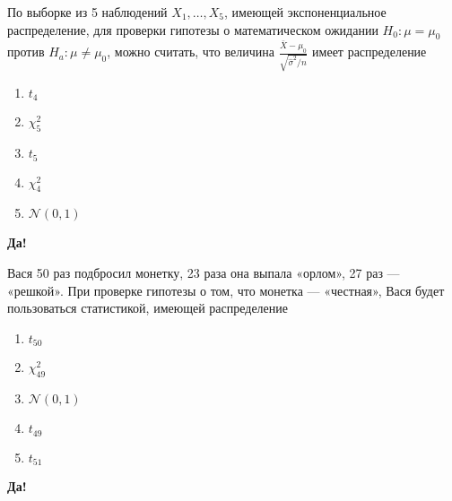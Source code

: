 \documentclass[t]{beamer}
\newcommand{\cN}{\mathcal{N}}
\begin{document}
 \begin{frame} \label{37-Yes} 
\begin{block}{37} 

  По выборке из 5 наблюдений $X_1,\ldots,X_{5}$, имеющей экспоненциальное распределение, для проверки гипотезы о математическом ожидании $H_0: \mu = \mu_0$ против $H_a: \mu \ne \mu_0$, можно считать, что величина $\frac{\bar{X} - \mu_0}{\sqrt{\hat{\sigma}^2 / n}}$ имеет распределение


 \end{block} 
\begin{enumerate} 
\item[] \hyperlink{37-No}{\beamergotobutton{} $t_4$}
\item[] \hyperlink{37-No}{\beamergotobutton{} $\chi^2_5$}
\item[] \hyperlink{37-No}{\beamergotobutton{} $t_5$}
\item[] \hyperlink{37-No}{\beamergotobutton{} $\chi^2_4$}
\item[] \hyperlink{37-No}{\beamergotobutton{} $\cN(0,1)$}
\end{enumerate} 

 \textbf{Да!} 
 \hyperlink{38}{}\end{frame} 


 \begin{frame} \label{38-Yes} 
\begin{block}{38} 

Вася 50 раз подбросил монетку, 23 раза она выпала «орлом», 27 раз — «решкой». При проверке гипотезы о том, что монетка — «честная», Вася будет пользоваться статистикой, имеющей распределение


 \end{block} 
\begin{enumerate} 
\item[] \hyperlink{38-No}{\beamergotobutton{} $t_{50}$}
\item[] \hyperlink{38-No}{\beamergotobutton{} $\chi^2_{49}$}
\item[] \hyperlink{38-Yes}{\beamergotobutton{} $\cN(0,1)$}
\item[] \hyperlink{38-No}{\beamergotobutton{} $t_{49}$}
\item[] \hyperlink{38-No}{\beamergotobutton{} $t_{51}$}
\end{enumerate} 

 \textbf{Да!} 
 \hyperlink{39}{}\end{frame} 
\end{document}
